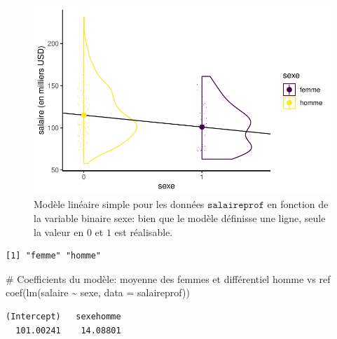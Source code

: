 \documentclass[
  11pt,
  letterpaper,
]{scrbook}
\newenvironment{Shaded}{\begin{snugshade}}{\end{snugshade}}
\newcommand{\AttributeTok}[1]{\textcolor[rgb]{0.40,0.45,0.13}{#1}}
\newcommand{\CommentTok}[1]{\textcolor[rgb]{0.37,0.37,0.37}{#1}}
\newcommand{\FunctionTok}[1]{\textcolor[rgb]{0.28,0.35,0.67}{#1}}
\newcommand{\NormalTok}[1]{\textcolor[rgb]{0.00,0.23,0.31}{#1}}
\newcommand{\SpecialCharTok}[1]{\textcolor[rgb]{0.37,0.37,0.37}{#1}}
\theoremstyle{definition}
\theoremstyle{remark}
\begin{document}
\begin{figure}[ht!]

{\centering \includegraphics{rappel-regressionlineaire_files/figure-pdf/fig-graphcollegesexe-1.pdf}

}

\caption{\label{fig-graphcollegesexe}Modèle linéaire simple pour les
données \(\texttt{salaireprof}\) en fonction de la variable binaire
sexe: bien que le modèle définisse une ligne, seule la valeur en \(0\)
et \(1\) est réalisable.}

\end{figure}

\begin{Shaded}
\end{Shaded}

\begin{verbatim}
[1] "femme" "homme"
\end{verbatim}

\begin{Shaded}
\begin{Highlighting}[]
\CommentTok{\# Coefficients du modèle: moyenne des femmes et différentiel homme vs ref}
\FunctionTok{coef}\NormalTok{(}\FunctionTok{lm}\NormalTok{(salaire }\SpecialCharTok{\textasciitilde{}}\NormalTok{ sexe, }\AttributeTok{data =}\NormalTok{ salaireprof))}
\end{Highlighting}
\end{Shaded}

\begin{verbatim}
(Intercept)   sexehomme 
  101.00241    14.08801 
\end{verbatim}
\end{document}
